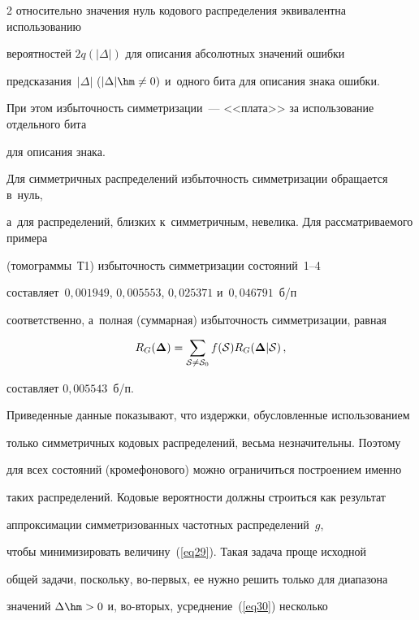 \begin{multicols}{2}
относительно значения нуль кодового распределения эквивалентна использованию 

вероятностей $2q(|\Delta|)$ для описания абсолютных значений ошибки 

предсказания~$|\Delta|$ ($|\Delta|\hm\neq 0)$ и~одного бита для описания знака ошибки. 

При этом избыточность симметризации~--- <<плата>> за использование отдельного бита 

для описания знака.



Для симметричных распределений избыточность симметризации обращается в~нуль, 

а~для распределений, близких к~симметричным, невелика. Для рассматриваемого примера 

(томограммы~Т1) избыточность симметризации состояний~1--4 

составляет~$0{,}001949$, $0{,}005553$, $0{,}025371$ и~$0{,}046791$~б/п 

соответственно, а~полная (суммарная) избыточность симметризации, равная

\begin{equation}

\label{eq31}

R_G(\boldsymbol{\Delta}) = \sum\limits_{{\cal S}\neq{\cal S}_0}

f({\cal S}) R_{G}(\boldsymbol{\Delta}|{\cal S})\,,

\end{equation}

составляет $0{,}005543$~б/п.



Приведенные данные показывают, что издержки, обусловленные использованием 

только сим\-мет\-рич\-ных кодовых распределений, весьма незначительны. Поэтому 

для всех состояний (кроме\linebreak фоново\-го) можно ограничиться построением именно 

таких распределений. Кодовые вероятности должны строиться как результат 

аппроксимации симметризованных частотных распределений~$g$, 

чтобы минимизировать величину~(\ref{eq29}). Такая задача проще исходной 

общей задачи, поскольку, во-пер\-вых, ее нужно решить только для диапазона 

значений $\Delta\hm> 0$ и, во-вто\-рых, усреднение~(\ref{eq30}) несколько 


\end{multicols}
